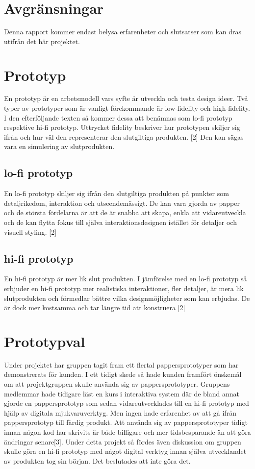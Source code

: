 \section{Avgränsningar}
Denna rapport kommer endast belysa erfarenheter och slutsatser som kan dras utifrån det här projektet.

\section{Prototyp} 
En prototyp är en arbetsmodell vars syfte är utveckla och testa design ideer. Två typer av prototyper som är vanligt förekommande är low-fidelity och high-fidelity. I den efterföljande texten så  kommer dessa att benämnas som lo-fi prototyp respektive hi-fi prototyp. Uttrycket fidelity beskriver hur prototypen skiljer sig ifrån och hur väl den representerar den slutgiltiga produkten. [2]  Den kan sägas vara en simulering av slutprodukten.    

\subsection{lo-fi prototyp} 
En lo-fi prototyp skiljer sig ifrån den slutgiltiga produkten på punkter som detaljrikedom, interaktion och utseendemässigt. De kan vara gjorda av papper och de största fördelarna är att de är snabba att skapa, enkla att vidareutveckla  och de kan flytta fokus till själva interaktionsdesignen istället för detaljer och visuell styling. [2]

\subsection{hi-fi prototyp}
En hi-fi prototyp är mer lik slut produkten.  I jämförelse med en lo-fi prototyp så erbjuder en hi-fi prototyp mer realistiska interaktioner, fler detaljer, är mera lik slutprodukten och förmedlar bättre vilka designmöjligheter som kan erbjudas. De är dock mer kostsamma och tar längre tid att konstruera  [2] 

\section{Prototypval}  
Under projektet har gruppen tagit fram ett flertal pappersprototyper som har demonstrerats för kunden. I ett tidigt skede så hade kunden framfört önskemål om att projektgruppen skulle använda sig av pappersprototyper. Gruppens medlemmar hade tidigare läst en kurs i interaktiva system där de bland annat gjorde en pappersprototyp som sedan vidareutvecklades till en hi-fi prototyp med hjälp av digitala mjukvaruverktyg. Men ingen hade erfarenhet av att gå ifrån pappersprototyp till färdig produkt. Att använda sig av pappersprototyper tidigt innan någon kod har skrivits är både billigare och mer tidsbesparande än att göra ändringar senare[3]. Under detta projekt så fördes även diskussion om gruppen skulle göra en hi-fi prototyp med något digital verktyg innan själva utvecklandet av produkten tog sin början. Det beslutades att inte göra det.    
  
